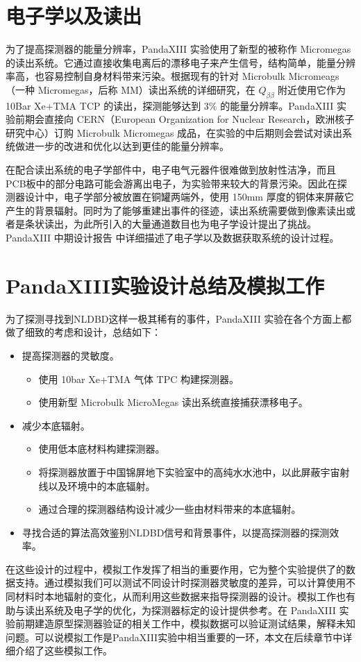 \section{电子学以及读出}

为了提高探测器的能量分辨率，PandaXIII 实验使用了新型的被称作 Micromegas 的读出系统。它通过直接收集电离后的漂移电子来产生信号，结构简单，能量分辨率高，也容易控制自身材料带来污染。根据现有的针对 Microbulk Micromeags（一种 Micromegas，后称 MM）读出系统的详细研究，在 $Q_{\beta\beta}$ 附近使用它作为 10Bar Xe+TMA TCP 的读出，探测能够达到 3\% 的能量分辨率。PandaXIII 实验前期会直接向 CERN（European Organization for Nuclear Research，欧洲核子研究中心）订购 Microbulk Micromegas 成品，在实验的中后期则会尝试对读出系统做进一步的改进和优化以达到更佳的能量分辨率\supercite{cdr}。

在配合读出系统的电子学部件中，电子电气元器件很难做到放射性洁净，而且PCB板中的部分电路可能会游离出电子，为实验带来较大的背景污染。因此在探测器设计中，电子学部分被放置在铜罐两端外，使用 150mm 厚度的铜体来屏蔽它产生的背景辐射。同时为了能够重建出事件的径迹，读出系统需要做到像素读出或者是条状读出，为此所引入的大量通道数目也为电子学设计提出了挑战。PandaXIII 中期设计报告\supercite{cdr} 中详细描述了电子学以及数据获取系统的设计过程。

\section{PandaXIII实验设计总结及模拟工作}

为了探测寻找到NLDBD这样一极其稀有的事件，PandaXIII 实验在各个方面上都做了细致的考虑和设计，总结如下：

\vspace{0.4cm}

\begin{itemize}
    \item 提高探测器的灵敏度。
    \begin{itemize}
        \item 使用 10bar Xe+TMA 气体 TPC 构建探测器。
        \item 使用新型 Microbulk MicroMegas 读出系统直接捕获漂移电子。
    \end{itemize}
    \item 减少本底辐射。
    \begin{itemize}
        \item 使用低本底材料构建探测器。
        \item 将探测器放置于中国锦屏地下实验室中的高纯水水池中，以此屏蔽宇宙射线以及环境中的本底辐射。
        \item 通过合理的探测器结构设计减少一些由材料带来的本底辐射。
    \end{itemize}
    \item 寻找合适的算法高效鉴别NLDBD信号和背景事件，以提高探测器的探测效率。
\end{itemize}

\vspace{0.4cm}

在这些设计的过程中，模拟工作发挥了相当的重要作用，它为整个实验提供了的数据支持。通过模拟我们可以测试不同设计时探测器灵敏度的差异，可以计算使用不同材料时本地辐射的变化，从而利用这些数据来指导探测器的设计。模拟工作也有助与读出系统及电子学的优化，为探测器标定的设计提供参考。在 PandaXIII 实验前期建造原型探测器验证的相关工作中，模拟数据可以验证测试结果，解释未知问题。可以说模拟工作是PandaXIII实验中相当重要的一环，本文在后续章节中详细介绍了这些模拟工作。


